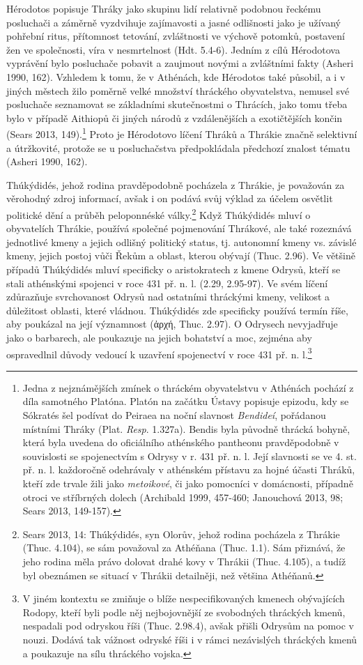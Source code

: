 Hérodotos popisuje Thráky jako skupinu lidí relativně podobnou řeckému posluchači a záměrně vyzdvihuje zajímavosti a jasné odlišnosti jako je užívaný pohřební ritus, přítomnost tetování, zvláštnosti ve výchově potomků, postavení žen ve společnosti, víra v nesmrtelnost (Hdt. 5.4-6). Jedním z cílů Hérodotova vyprávění bylo posluchače pobavit a zaujmout novými a zvláštními fakty (Asheri 1990, 162). Vzhledem k tomu, že v Athénách, kde Hérodotos také působil, a i v jiných městech žilo poměrně velké množství thráckého obyvatelstva, nemusel své posluchače seznamovat se základními skutečnostmi o Thrácích, jako tomu třeba bylo v případě Aithiopů či jiných národů z vzdálenějších a exotičtějších končin (Sears 2013, 149).\footnote{Jedna z nejznámějších zmínek o thráckém obyvatelstvu v Athénách pochází z díla samotného Platóna. Platón na začátku Ústavy popisuje epizodu, kdy se Sókratés šel podívat do Peiraea na noční slavnost {\em Bendideí}, pořádanou místními Thráky (Plat. {\em Resp}. 1.327a). Bendis byla původně thrácká bohyně, která byla uvedena do oficiálního athénského pantheonu pravděpodobně v souvislosti se spojenectvím s Odrysy v r. 431 př. n. l. Její slavnosti se ve 4. st. př. n. l. každoročně odehrávaly v athénském přístavu za hojné účasti Thráků, kteří zde trvale žili jako {\em metoikové}, či jako pomocníci v domácnosti, případně otroci ve stříbrných dolech (Archibald 1999, 457-460; Janouchová 2013, 98; Sears 2013, 149-157).} Proto je Hérodotovo líčení Thráků a Thrákie značně selektivní a útržkovité, protože se u posluchačstva předpokládala předchozí znalost tématu (Asheri 1990, 162).

Thúkýdidés, jehož rodina pravděpodobně pocházela z Thrákie, je považován za věrohodný zdroj informací, avšak i on podává svůj výklad za účelem osvětlit politické dění a průběh peloponnéské války.\footnote{Sears 2013, 14: Thúkýdidés, syn Olorův, jehož rodina pocházela z Thrákie (Thuc. 4.104), se sám považoval za Athéňana (Thuc. 1.1). Sám přiznává, že jeho rodina měla právo dolovat drahé kovy v Thrákii (Thuc. 4.105), a tudíž byl obeznámen se situací v Thrákii detailněji, než většina Athéňanů.} Když Thúkýdidés mluví o obyvatelích Thrákie, používá společné pojmenování Thrákové, ale také rozeznává jednotlivé kmeny a jejich odlišný politický status, tj. autonomní kmeny vs. závislé kmeny, jejich postoj vůči Řekům a oblast, kterou obývají (Thuc. 2.96). Ve většině případů Thúkýdidés mluví specificky o aristokratech z kmene Odrysů, kteří se stali athénskými spojenci v roce 431 př. n. l. (2.29, 2.95-97). Ve svém líčení zdůrazňuje svrchovanost Odrysů nad ostatními thráckými kmeny, velikost a důležitost oblasti, které vládnou. Thúkýdidés zde specificky používá termín říše, aby poukázal na její významnost (ἀρχή, Thuc. 2.97). O Odrysech nevyjadřuje jako o barbarech, ale poukazuje na jejich bohatství a moc, zejména aby ospravedlnil důvody vedoucí k uzavření spojenectví v roce 431 př. n. l.\footnote{V jiném kontextu se zmiňuje o blíže nespecifikovaných kmenech obývajících Rodopy, kteří byli podle něj nejbojovnější ze svobodných thráckých kmenů, nespadali pod odryskou říši (Thuc. 2.98.4), avšak přišli Odrysům na pomoc v nouzi. Dodává tak vážnost odryské říši i v rámci nezávislých thráckých kmenů a poukazuje na sílu thráckého vojska.}

